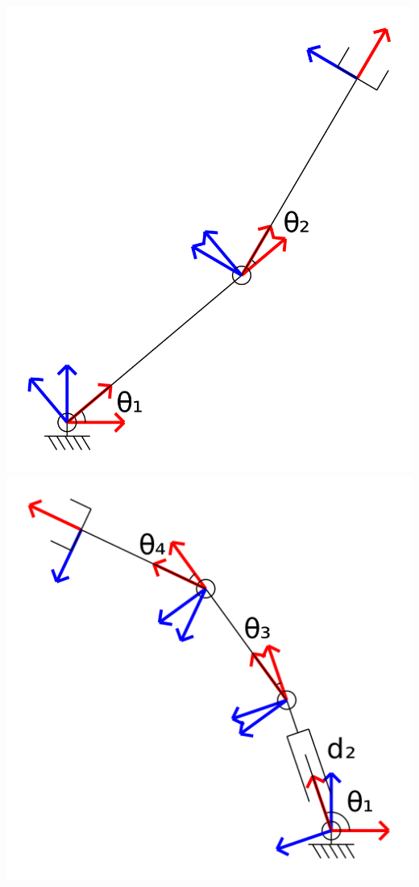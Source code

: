 \documentclass{16384_doc}
\begin{document}
\begin{center}
\includegraphics[scale=0.05]{generated_figures/bg_example_diagram_1.png}
\includegraphics[scale=0.05]{generated_figures/bg_example_diagram_2.png}

\end{center}
\end{document}
